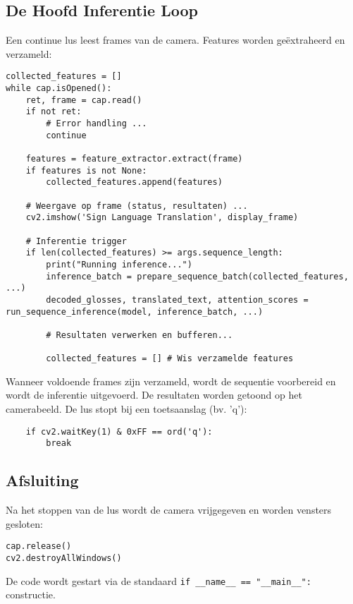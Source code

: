 \subsection{De Hoofd Inferentie Loop}
\label{sec:main-loop-latex}

Een continue lus leest frames van de camera. Features worden geëxtraheerd en verzameld:
\begin{lstlisting}
collected_features = []
while cap.isOpened():
    ret, frame = cap.read()
    if not ret:
        # Error handling ...
        continue

    features = feature_extractor.extract(frame)
    if features is not None:
        collected_features.append(features)

    # Weergave op frame (status, resultaten) ...
    cv2.imshow('Sign Language Translation', display_frame)

    # Inferentie trigger
    if len(collected_features) >= args.sequence_length:
        print("Running inference...")
        inference_batch = prepare_sequence_batch(collected_features, ...)
        decoded_glosses, translated_text, attention_scores = run_sequence_inference(model, inference_batch, ...)

        # Resultaten verwerken en bufferen...

        collected_features = [] # Wis verzamelde features
\end{lstlisting}
Wanneer voldoende frames zijn verzameld, wordt de sequentie voorbereid en wordt de inferentie uitgevoerd. De resultaten worden getoond op het camerabeeld. De lus stopt bij een toetsaanslag (bv. 'q'):
\begin{lstlisting}
    if cv2.waitKey(1) & 0xFF == ord('q'):
        break
\end{lstlisting}

\subsection{Afsluiting}
\label{sec:main-afsluiting-latex}

Na het stoppen van de lus wordt de camera vrijgegeven en worden vensters gesloten:
\begin{lstlisting}
cap.release()
cv2.destroyAllWindows()
\end{lstlisting}
De code wordt gestart via de standaard \texttt{if \_\_name\_\_ == "\_\_main\_\_":} constructie.

